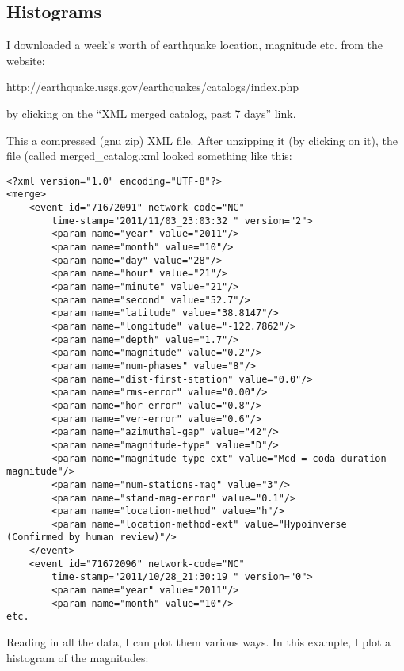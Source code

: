 {{{\subsection{Histograms}

I downloaded a week's worth of earthquake location, magnitude etc. from the website: 

http://earthquake.usgs.gov/earthquakes/catalogs/index.php

\noindent by clicking on the ``XML merged catalog, past 7 days''  link.  

\noindent This a compressed (gnu zip)  XML file. After unzipping it (by clicking on it), the file (called {\color{blue}merged\_catalog.xml} looked something like this:

{\singlespacing \begin{verbatim}
<?xml version="1.0" encoding="UTF-8"?>
<merge>
    <event id="71672091" network-code="NC"
        time-stamp="2011/11/03_23:03:32 " version="2">
        <param name="year" value="2011"/>
        <param name="month" value="10"/>
        <param name="day" value="28"/>
        <param name="hour" value="21"/>
        <param name="minute" value="21"/>
        <param name="second" value="52.7"/>
        <param name="latitude" value="38.8147"/>
        <param name="longitude" value="-122.7862"/>
        <param name="depth" value="1.7"/>
        <param name="magnitude" value="0.2"/>
        <param name="num-phases" value="8"/>
        <param name="dist-first-station" value="0.0"/>
        <param name="rms-error" value="0.00"/>
        <param name="hor-error" value="0.8"/>
        <param name="ver-error" value="0.6"/>
        <param name="azimuthal-gap" value="42"/>
        <param name="magnitude-type" value="D"/>
        <param name="magnitude-type-ext" value="Mcd = coda duration magnitude"/>
        <param name="num-stations-mag" value="3"/>
        <param name="stand-mag-error" value="0.1"/>
        <param name="location-method" value="h"/>
        <param name="location-method-ext" value="Hypoinverse (Confirmed by human review)"/>
    </event>
    <event id="71672096" network-code="NC"
        time-stamp="2011/10/28_21:30:19 " version="0">
        <param name="year" value="2011"/>
        <param name="month" value="10"/>
etc.
\end{verbatim}}


Reading in all the data, I can plot them various ways.  In this example, I plot a histogram of the magnitudes:

}}}
